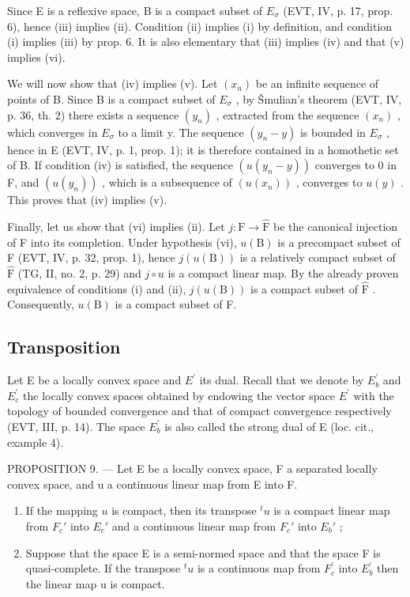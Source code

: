 Since E is a reflexive space, B is a compact subset of \(E_{\sigma}\) (EVT, IV, p. 17, prop. 6), hence (iii) implies (ii). Condition (ii) implies (i) by definition, and condition (i) implies (iii) by prop. 6. It is also elementary that (iii) implies (iv) and that (v) implies (vi).

We will now show that (iv) implies (v). Let \((x_{n})\) be an infinite sequence of points of B. Since B is a compact subset of \(E_{\sigma}\) , by Šmulian's theorem (EVT, IV, p. 36, th. 2) there exists a sequence \((y_{n})\) , extracted from the sequence \((x_{n})\) , which converges in \(E_{\sigma}\) to a limit y. The sequence \((y_{n}-y)\) is bounded in \(E_{\sigma}\) , hence in E (EVT, IV, p. 1, prop. 1); it is therefore contained in a homothetic set of B. If condition (iv) is satisfied, the sequence \((u(y_{n}-y))\) converges to 0 in F, and \((u(y_{n}))\) , which is a subsequence of \((u(x_{n}))\) , converges to \(u(y)\) . This proves that (iv) implies (v).

Finally, let us show that (vi) implies (ii). Let \(j: \mathrm{F} \to \widehat{\mathrm{F}}\) be the canonical injection of F into its completion. Under hypothesis (vi), \(u(\mathrm{B})\) is a precompact subset of F (EVT, IV, p. 32, prop. 1), hence \(j(u(\mathrm{B}))\) is a relatively compact subset of \(\widehat{\mathrm{F}}\) (TG, II, no. 2, p. 29) and \(j \circ u\) is a compact linear map. By the already proven equivalence of conditions (i) and (ii), \(j(u(\mathrm{B}))\) is a compact subset of \(\widehat{\mathrm{F}}\) . Consequently, \(u(\mathrm{B})\) is a compact subset of F.

\subsection{Transposition}

Let E be a locally convex space and \(E^{\prime}\) its dual. Recall that we denote by \(E_{b}^{\prime}\) and \(E_{c}^{\prime}\) the locally convex spaces obtained by endowing the vector space \(E^{\prime}\) with the topology of bounded convergence and that of compact convergence respectively (EVT, III, p. 14). The space \(E_{b}^{\prime}\) is also called the strong dual of E (loc. cit., example 4).

PROPOSITION 9. --- Let E be a locally convex space, F a separated locally convex space, and u a continuous linear map from E into F.

\begin{enumerate}
\def\labelenumi{\alph{enumi})}
\item
  If the mapping \(u\) is compact, then its transpose \(^{t}u\) is a compact linear map from \(F_c'\) into \(E_c'\) and a continuous linear map from \(F_c'\) into \(E_b'\) ;
\item
  Suppose that the space E is a semi-normed space and that the space F is quasi-complete. If the transpose \({}^{t}u\) is a continuous map from \(F_{c}^{\prime}\) into \(E_{b}^{\prime}\) then the linear map u is compact.
\end{enumerate}

